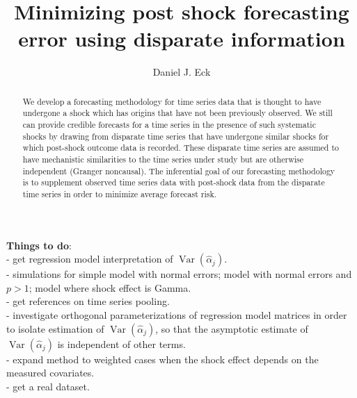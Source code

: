 \documentclass[11pt]{article}
\title{Minimizing post shock forecasting error using disparate information}
\author{Daniel J. Eck}
\DeclareMathOperator{\Var}{Var}
\begin{document}
\maketitle
\begin{abstract}
    We develop a forecasting methodology for time series data that is 
    thought to have undergone a shock which has origins that have not been 
    previously observed.  We still can provide credible forecasts for a time 
    series in the presence of such systematic shocks by drawing from disparate 
    time series that have undergone similar shocks for which post-shock 
    outcome data is recorded.  These disparate time series are assumed to have 
    mechanistic similarities to the time series under study but are otherwise 
    independent (Granger noncausal).  The inferential goal of our forecasting 
    methodology is to supplement observed time series data with post-shock 
    data from the disparate time series in order to minimize average forecast 
    risk. 
\end{abstract}


{\bf Things to do}: \\

  - get regression model interpretation of $\Var(\hat\alpha_j)$. \\

  - simulations for simple model with normal errors; model with normal 
    errors and $p > 1$; model where shock effect is Gamma. \\

  - get references on time series pooling. \\

  - investigate orthogonal parameterizations of regression model 
    matrices in order to isolate estimation of $\Var(\hat\alpha_j)$, 
    so that the asymptotic estimate of $\Var(\hat\alpha_j)$ is independent 
    of other terms. \\

  - expand method to weighted cases when the shock effect depends on the 
    measured covariates. \\

  - get a real dataset. \\ 
\end{document}
